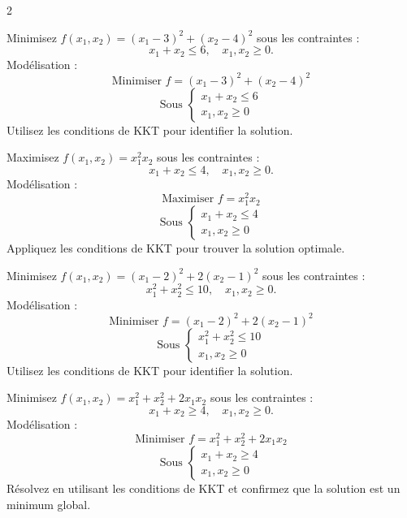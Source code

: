 \begin{multicols}{2}
\begin{exo}
	Minimisez \( f(x_1, x_2) = (x_1 - 3)^2 + (x_2 - 4)^2 \) sous les contraintes :
	\[
	x_1 + x_2 \leq 6, \quad x_1, x_2 \geq 0.
	\]
	Modélisation :
	\[
	\text{Minimiser } f = (x_1 - 3)^2 + (x_2 - 4)^2
	\]
	\[
	\text{Sous } \begin{cases}
	x_1 + x_2 \leq 6 \\
	x_1, x_2 \geq 0
	\end{cases}
	\]
	Utilisez les conditions de KKT pour identifier la solution.
\end{exo}

\begin{exo}
	Maximisez \( f(x_1, x_2) = x_1^2 x_2 \) sous les contraintes :
	\[
	x_1 + x_2 \leq 4, \quad x_1, x_2 \geq 0.
	\]
	Modélisation :
	\[
	\text{Maximiser } f = x_1^2 x_2
	\]
	\[
	\text{Sous } \begin{cases}
	x_1 + x_2 \leq 4 \\
	x_1, x_2 \geq 0
	\end{cases}
	\]
	Appliquez les conditions de KKT pour trouver la solution optimale.
\end{exo}

\begin{exo}
	Minimisez \( f(x_1, x_2) = (x_1 - 2)^2 + 2(x_2 - 1)^2 \) sous les contraintes :
	\[
	x_1^2 + x_2^2 \leq 10, \quad x_1, x_2 \geq 0.
	\]
	Modélisation :
	\[
	\text{Minimiser } f = (x_1 - 2)^2 + 2(x_2 - 1)^2
	\]
	\[
	\text{Sous } \begin{cases}
	x_1^2 + x_2^2 \leq 10 \\
	x_1, x_2 \geq 0
	\end{cases}
	\]
	Utilisez les conditions de KKT pour identifier la solution.
\end{exo}

\begin{exo}
	Minimisez \( f(x_1, x_2) = x_1^2 + x_2^2 + 2x_1 x_2 \) sous les contraintes :
	\[
	x_1 + x_2 \geq 4, \quad x_1, x_2 \geq 0.
	\]
	Modélisation :
	\[
	\text{Minimiser } f = x_1^2 + x_2^2 + 2x_1 x_2
	\]
	\[
	\text{Sous } \begin{cases}
	x_1 + x_2 \geq 4 \\
	x_1, x_2 \geq 0
	\end{cases}
	\]
	Résolvez en utilisant les conditions de KKT et confirmez que la solution est un minimum global.
\end{exo}


\end{multicols}
